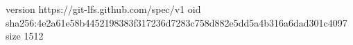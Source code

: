 version https://git-lfs.github.com/spec/v1
oid sha256:4e2a61e58b4452198383f317236d7283c758d882e5dd5a4b316a6dad301c4097
size 1512
